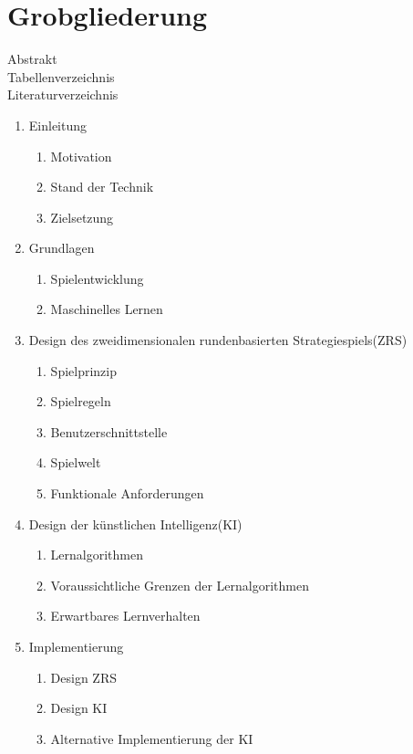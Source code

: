 \documentclass[12pt,a4paper]{article}
\begin{document}
\section*{Grobgliederung}
Abstrakt\\
Tabellenverzeichnis\\
Literaturverzeichnis
\begin{enumerate}
	\item Einleitung
	\begin{enumerate}
		\item Motivation
		\item Stand der Technik
		\item Zielsetzung
	\end{enumerate}
	
	\item Grundlagen
	\begin{enumerate}
		\item Spielentwicklung
		\item Maschinelles Lernen
	\end{enumerate}
	
	\item Design des zweidimensionalen rundenbasierten Strategiespiels(ZRS)
	\begin{enumerate}
		\item Spielprinzip
		\item Spielregeln
		\item Benutzerschnittstelle
		\item Spielwelt
		\item Funktionale Anforderungen
	\end{enumerate}
	
	\item Design der künstlichen Intelligenz(KI)
	\begin{enumerate}
		\item Lernalgorithmen
		\item Voraussichtliche Grenzen der Lernalgorithmen
		\item Erwartbares Lernverhalten
	\end{enumerate}		
	
	\item Implementierung
	\begin{enumerate}
		\item Design ZRS
		\item Design KI
		\item Alternative Implementierung der KI
	\end{enumerate}
	

\end{enumerate}
\end{document}
